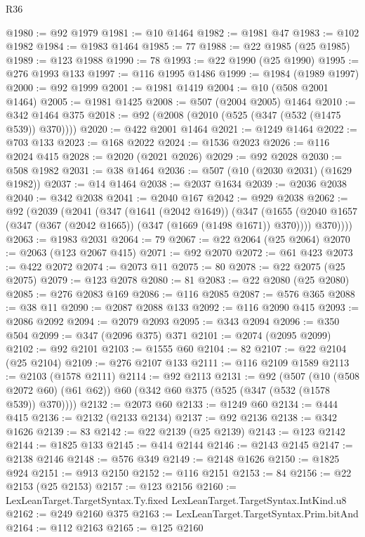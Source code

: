 \begin{lexlean}{R36}
\begin{coremodule}
@1980 := @92 @1979
@1981 := @10 @1464
@1982 := @1981 @47
@1983 := @102 @1982
@1984 := @1983 @1464
@1985 := 77
@1988 := @22 @1985 (@25 @1985)
@1989 := @123 @1988
@1990 := 78
@1993 := @22 @1990 (@25 @1990)
@1995 := @276 @1993 @133
@1997 := @116 @1995 @1486
@1999 := @1984 (@1989 @1997)
@2000 := @92 @1999
@2001 := @1981 @1419
@2004 := @10 (@508 @2001 @1464)
@2005 := @1981 @1425
@2008 := @507 (@2004 @2005) @1464
@2010 := @342 @1464 @375
@2018 := @92 (@2008 (@2010 (@525 (@347 (@532 (@1475 @539)) @370))))
@2020 := @422 @2001 @1464
@2021 := @1249 @1464
@2022 := @703 @133
@2023 := @168 @2022
@2024 := @1536 @2023
@2026 := @116 @2024 @415
@2028 := @2020 (@2021 @2026)
@2029 := @92 @2028
@2030 := @508 @1982
@2031 := @38 @1464
@2036 := @507 (@10 (@2030 @2031) (@1629 @1982))
@2037 := @14 @1464
@2038 := @2037 @1634
@2039 := @2036 @2038
@2040 := @342 @2038
@2041 := @2040 @167
@2042 := @929 @2038
@2062 := @92
    (@2039
      (@2041
        (@347
          (@1641 (@2042 @1649))
          (@347
            (@1655 (@2040 @1657 (@347 (@367 (@2042 @1665)) (@347 (@1669 (@1498 @1671)) @370))))
            @370))))
@2063 := @1983 @2031
@2064 := 79
@2067 := @22 @2064 (@25 @2064)
@2070 := @2063 (@123 @2067 @415)
@2071 := @92 @2070
@2072 := @61 @423
@2073 := @422 @2072
@2074 := @2073 @11
@2075 := 80
@2078 := @22 @2075 (@25 @2075)
@2079 := @123 @2078
@2080 := 81
@2083 := @22 @2080 (@25 @2080)
@2085 := @276 @2083 @169
@2086 := @116 @2085
@2087 := @576 @365
@2088 := @38 @11
@2090 := @2087 @2088 @133
@2092 := @116 @2090 @415
@2093 := @2086 @2092
@2094 := @2079 @2093
@2095 := @343 @2094
@2096 := @350 @504
@2099 := @347 (@2096 @375) @371
@2101 := @2074 (@2095 @2099)
@2102 := @92 @2101
@2103 := @1555 @60
@2104 := 82
@2107 := @22 @2104 (@25 @2104)
@2109 := @276 @2107 @133
@2111 := @116 @2109 @1589
@2113 := @2103 (@1578 @2111)
@2114 := @92 @2113
@2131 := @92
    (@507
      (@10 (@508 @2072 @60) (@61 @62))
      @60
      (@342 @60 @375 (@525 (@347 (@532 (@1578 @539)) @370))))
@2132 := @2073 @60
@2133 := @1249 @60
@2134 := @444 @415
@2136 := @2132 (@2133 @2134)
@2137 := @92 @2136
@2138 := @342 @1626
@2139 := 83
@2142 := @22 @2139 (@25 @2139)
@2143 := @123 @2142
@2144 := @1825 @133
@2145 := @414 @2144
@2146 := @2143 @2145
@2147 := @2138 @2146
@2148 := @576 @349
@2149 := @2148 @1626
@2150 := @1825 @924
@2151 := @913 @2150
@2152 := @116 @2151
@2153 := 84
@2156 := @22 @2153 (@25 @2153)
@2157 := @123 @2156
@2160 := LexLeanTarget.TargetSyntax.Ty.fixed LexLeanTarget.TargetSyntax.IntKind.u8
@2162 := @249 @2160 @375
@2163 := LexLeanTarget.TargetSyntax.Prim.bitAnd
@2164 := @112 @2163
@2165 := @125 @2160

\end{coremodule}
\end{lexlean}
